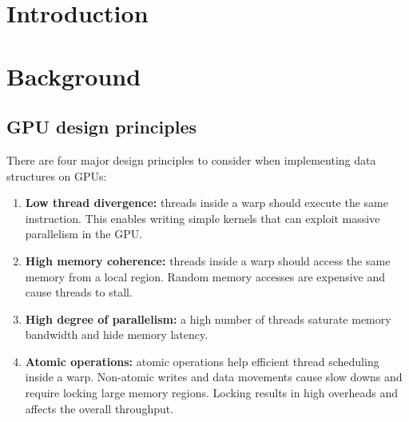 
\section{Introduction}
\label{intro}



\section{Background}

\subsection{GPU design principles}
There are four major design principles to consider when implementing data
structures on GPUs:

\begin{enumerate}[noitemsep, leftmargin=*]
    \item \textbf{Low thread divergence:} threads inside a warp should execute
      the same instruction. This enables writing simple kernels that can exploit
      massive parallelism in the GPU\@.
    \item \textbf{High memory coherence:} threads inside a warp should access
      the same  memory from a local region. Random memory accesses are expensive
      and cause threads to stall.
    \item \textbf{High degree of parallelism:} a high number of threads saturate
      memory bandwidth and hide memory latency.
    \item \textbf{Atomic operations:} atomic operations help efficient thread
      scheduling inside a warp. Non-atomic writes and data movements cause slow
      downs and require locking large memory regions. Locking results in high
      overheads and affects the overall throughput.
    \end{enumerate}

